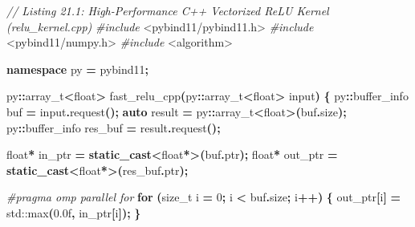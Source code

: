 \documentclass[
  letterpaper,
]{scrbook}
\newenvironment{Shaded}{\begin{snugshade}}{\end{snugshade}}
\newcommand{\BuiltInTok}[1]{#1}
\newcommand{\CommentTok}[1]{\textcolor[rgb]{0.56,0.35,0.01}{\textit{#1}}}
\newcommand{\ControlFlowTok}[1]{\textcolor[rgb]{0.13,0.29,0.53}{\textbf{#1}}}
\newcommand{\DataTypeTok}[1]{\textcolor[rgb]{0.13,0.29,0.53}{#1}}
\newcommand{\DecValTok}[1]{\textcolor[rgb]{0.00,0.00,0.81}{#1}}
\newcommand{\FloatTok}[1]{\textcolor[rgb]{0.00,0.00,0.81}{#1}}
\newcommand{\ImportTok}[1]{#1}
\newcommand{\KeywordTok}[1]{\textcolor[rgb]{0.13,0.29,0.53}{\textbf{#1}}}
\newcommand{\NormalTok}[1]{#1}
\newcommand{\OperatorTok}[1]{\textcolor[rgb]{0.81,0.36,0.00}{\textbf{#1}}}
\newcommand{\PreprocessorTok}[1]{\textcolor[rgb]{0.56,0.35,0.01}{\textit{#1}}}
\begin{document}
\begin{Shaded}
\begin{Highlighting}[]
\CommentTok{// Listing 21.1: High{-}Performance C++ Vectorized ReLU Kernel (relu\_kernel.cpp)}
\PreprocessorTok{\#include }\ImportTok{\textless{}pybind11/pybind11.h\textgreater{}}
\PreprocessorTok{\#include }\ImportTok{\textless{}pybind11/numpy.h\textgreater{}}
\PreprocessorTok{\#include }\ImportTok{\textless{}algorithm\textgreater{}}

\KeywordTok{namespace}\NormalTok{ py }\OperatorTok{=}\NormalTok{ pybind11}\OperatorTok{;}

\NormalTok{py}\OperatorTok{::}\DataTypeTok{array\_t}\OperatorTok{\textless{}}\DataTypeTok{float}\OperatorTok{\textgreater{}}\NormalTok{ fast\_relu\_cpp}\OperatorTok{(}\NormalTok{py}\OperatorTok{::}\DataTypeTok{array\_t}\OperatorTok{\textless{}}\DataTypeTok{float}\OperatorTok{\textgreater{}}\NormalTok{ input}\OperatorTok{)} \OperatorTok{\{}
\NormalTok{    py}\OperatorTok{::}\NormalTok{buffer\_info buf }\OperatorTok{=}\NormalTok{ input}\OperatorTok{.}\NormalTok{request}\OperatorTok{();}
    \KeywordTok{auto}\NormalTok{ result }\OperatorTok{=}\NormalTok{ py}\OperatorTok{::}\DataTypeTok{array\_t}\OperatorTok{\textless{}}\DataTypeTok{float}\OperatorTok{\textgreater{}(}\NormalTok{buf}\OperatorTok{.}\NormalTok{size}\OperatorTok{);}
\NormalTok{    py}\OperatorTok{::}\NormalTok{buffer\_info res\_buf }\OperatorTok{=}\NormalTok{ result}\OperatorTok{.}\NormalTok{request}\OperatorTok{();}

    \DataTypeTok{float}\OperatorTok{*}\NormalTok{ in\_ptr }\OperatorTok{=} \KeywordTok{static\_cast}\OperatorTok{\textless{}}\DataTypeTok{float}\OperatorTok{*\textgreater{}(}\NormalTok{buf}\OperatorTok{.}\NormalTok{ptr}\OperatorTok{);}
    \DataTypeTok{float}\OperatorTok{*}\NormalTok{ out\_ptr }\OperatorTok{=} \KeywordTok{static\_cast}\OperatorTok{\textless{}}\DataTypeTok{float}\OperatorTok{*\textgreater{}(}\NormalTok{res\_buf}\OperatorTok{.}\NormalTok{ptr}\OperatorTok{);}

    \PreprocessorTok{\#pragma omp parallel for}
    \ControlFlowTok{for} \OperatorTok{(}\DataTypeTok{size\_t}\NormalTok{ i }\OperatorTok{=} \DecValTok{0}\OperatorTok{;}\NormalTok{ i }\OperatorTok{\textless{}}\NormalTok{ buf}\OperatorTok{.}\NormalTok{size}\OperatorTok{;}\NormalTok{ i}\OperatorTok{++)} \OperatorTok{\{}
\NormalTok{        out\_ptr}\OperatorTok{[}\NormalTok{i}\OperatorTok{]} \OperatorTok{=} \BuiltInTok{std::}\NormalTok{max}\OperatorTok{(}\FloatTok{0.0}\BuiltInTok{f}\OperatorTok{,}\NormalTok{ in\_ptr}\OperatorTok{[}\NormalTok{i}\OperatorTok{]);}
    \OperatorTok{\}}


\end{Highlighting}
\end{Shaded}
\end{document}
